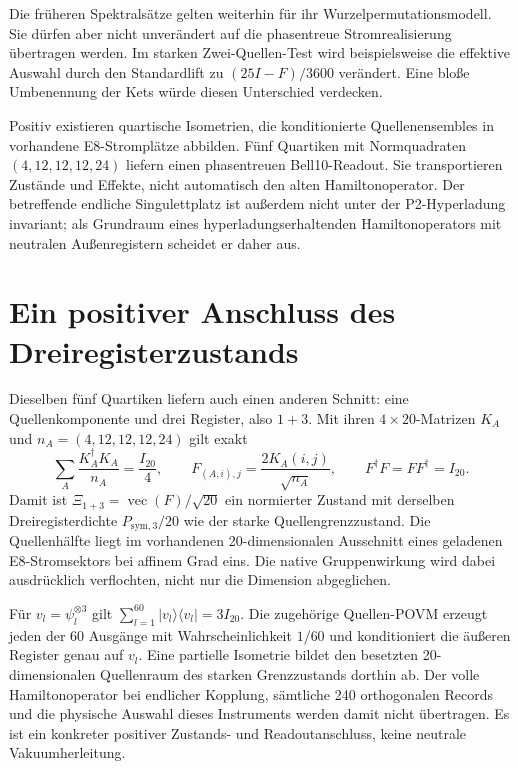 Die früheren Spektralsätze gelten weiterhin für ihr Wurzelpermutationsmodell. Sie dürfen aber nicht unverändert auf die phasentreue Stromrealisierung übertragen werden. Im starken Zwei-Quellen-Test wird beispielsweise die effektive Auswahl durch den Standardlift zu $(25I-F)/3600$ verändert. Eine bloße Umbenennung der Kets würde diesen Unterschied verdecken. 

Positiv existieren quartische Isometrien, die konditionierte Quellenensembles in vorhandene E8-Stromplätze abbilden. Fünf Quartiken mit Normquadraten $(4,12,12,12,24)$ liefern einen phasentreuen Bell10-Readout. Sie transportieren Zustände und Effekte, nicht automatisch den alten Hamiltonoperator. Der betreffende endliche Singulettplatz ist außerdem nicht unter der P2-Hyperladung invariant; als Grundraum eines hyperladungserhaltenden Hamiltonoperators mit neutralen Außenregistern scheidet er daher aus. 


\section{Ein positiver Anschluss des Dreiregisterzustands}
Dieselben fünf Quartiken liefern auch einen anderen Schnitt: eine Quellenkomponente und drei Register, also $1+3$. Mit ihren $4\times20$-Matrizen $K_A$ und $n_A=(4,12,12,12,24)$ gilt exakt
\[
 \sum_A\frac{K_A^\dagger K_A}{n_A}=\frac{I_{20}}4,
 \qquad F_{(A,i),j}=\frac{2K_A(i,j)}{\sqrt{n_A}},
 \qquad F^\dagger F=FF^\dagger=I_{20}.
\]
Damit ist $\Xi_{1+3}=\operatorname{vec}(F)/\sqrt{20}$ ein normierter Zustand mit derselben Dreiregisterdichte $P_{\mathrm{sym},3}/20$ wie der starke Quellengrenzzustand. Die Quellenhälfte liegt im vorhandenen 20-dimensionalen Ausschnitt eines geladenen E8-Stromsektors bei affinem Grad eins. Die native Gruppenwirkung wird dabei ausdrücklich verflochten, nicht nur die Dimension abgeglichen.

Für $v_l=\psi_l^{\otimes3}$ gilt $\sum_{l=1}^{60}|v_l\rangle\langle v_l|=3I_{20}$. Die zugehörige Quellen-POVM erzeugt jeden der 60 Ausgänge mit Wahrscheinlichkeit $1/60$ und konditioniert die äußeren Register genau auf $v_l$. Eine partielle Isometrie bildet den besetzten 20-dimensionalen Quellenraum des starken Grenzzustands dorthin ab. Der volle Hamiltonoperator bei endlicher Kopplung, sämtliche 240 orthogonalen Records und die physische Auswahl dieses Instruments werden damit nicht übertragen. Es ist ein konkreter positiver Zustands- und Readoutanschluss, keine neutrale Vakuumherleitung. 

